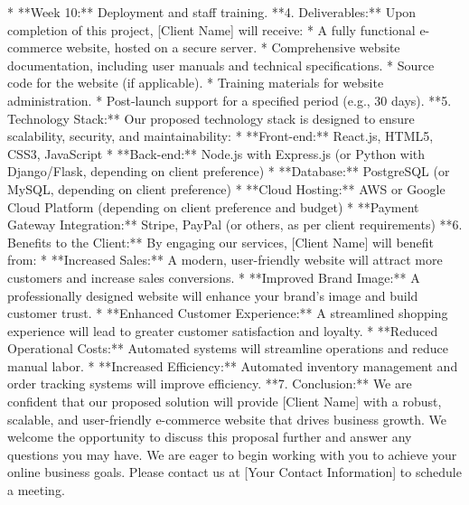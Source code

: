 \documentclass[12pt]{article}%
\begin{document}
%
* **Week 10:** Deployment and staff training.\newline%
%
**4. Deliverables:**\newline%
%
Upon completion of this project, {[}Client Name{]} will receive:\newline%
%
* A fully functional e{-}commerce website, hosted on a secure server.\newline%
%
* Comprehensive website documentation, including user manuals and technical specifications.\newline%
%
* Source code for the website (if applicable).\newline%
%
* Training materials for website administration.\newline%
%
* Post{-}launch support for a specified period (e.g., 30 days).\newline%
%
**5. Technology Stack:**\newline%
%
Our proposed technology stack is designed to ensure scalability, security, and maintainability:\newline%
%
* **Front{-}end:** React.js, HTML5, CSS3, JavaScript\newline%
%
* **Back{-}end:** Node.js with Express.js (or Python with Django/Flask, depending on client preference)\newline%
%
* **Database:** PostgreSQL (or MySQL, depending on client preference)\newline%
%
* **Cloud Hosting:** AWS or Google Cloud Platform (depending on client preference and budget)\newline%
%
* **Payment Gateway Integration:** Stripe, PayPal (or others, as per client requirements)\newline%
%
**6. Benefits to the Client:**\newline%
%
By engaging our services, {[}Client Name{]} will benefit from:\newline%
%
* **Increased Sales:** A modern, user{-}friendly website will attract more customers and increase sales conversions.\newline%
%
* **Improved Brand Image:** A professionally designed website will enhance your brand's image and build customer trust.\newline%
%
* **Enhanced Customer Experience:** A streamlined shopping experience will lead to greater customer satisfaction and loyalty.\newline%
%
* **Reduced Operational Costs:** Automated systems will streamline operations and reduce manual labor.\newline%
%
* **Increased Efficiency:**  Automated inventory management and order tracking systems will improve efficiency.\newline%
%
**7. Conclusion:**\newline%
%
We are confident that our proposed solution will provide {[}Client Name{]} with a robust, scalable, and user{-}friendly e{-}commerce website that drives business growth.  We welcome the opportunity to discuss this proposal further and answer any questions you may have.  We are eager to begin working with you to achieve your online business goals.  Please contact us at {[}Your Contact Information{]} to schedule a meeting.\newline%
%
\end{document}
